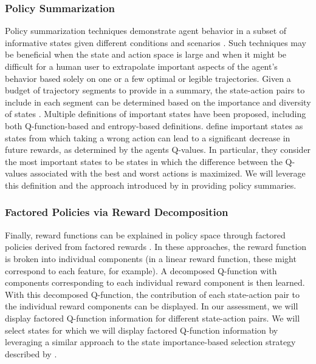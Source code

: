 \documentclass[letterpaper]{article} %
\begin{document}
\subsubsection{Policy Summarization}
Policy summarization techniques demonstrate agent behavior in a subset of informative states given different conditions and scenarios \cite{amir2018agent, lage2019exploring}. Such techniques may be beneficial when the state and action space is large and when it might be difficult for a human user to extrapolate important aspects of the agent's behavior based solely on one or a few optimal or legible trajectories. Given a budget of trajectory segments to provide in a summary, the state-action pairs to include in each segment can be determined based on the importance and diversity of states \cite{amir2018highlights}. Multiple definitions of important states have been proposed, including both Q-function-based \cite{amir2018highlights} and entropy-based \cite{huang2018establishing} definitions.  \citet{amir2018highlights} define important states as states from which taking a wrong action can lead to a significant decrease in future rewards, as determined by
the agents Q-values. In particular, they consider the most important states to be states in which the difference between the Q-values associated with the best and worst actions is maximized. We will leverage this definition and the approach introduced by \citet{amir2018highlights} in providing policy summaries.


\subsubsection{Factored Policies via Reward Decomposition}
Finally, reward functions can be explained in policy space through factored policies derived from factored rewards \cite{anderson2019explaining, juozapaitis2019explainable}. In these approaches, the reward function is broken into individual components (in a linear reward function, these might correspond to each feature, for example). A decomposed Q-function with components corresponding to each individual reward component is then learned. With this decomposed Q-function, the contribution of each state-action pair to the individual reward components can be displayed. In our assessment, we will display factored Q-function information for different state-action pairs. We will select states for which we will display factored Q-function information by leveraging a  similar approach to the state importance-based selection strategy described by \citet{amir2018highlights}.
\end{document}

